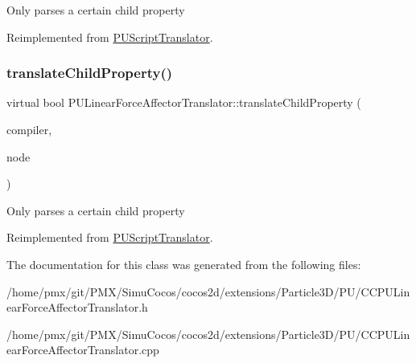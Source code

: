 Only parses a certain child property 

Reimplemented from \hyperlink{classPUScriptTranslator_a0374d83a8a04e57918975d525e0f8fe8}{P\+U\+Script\+Translator}.

\mbox{\label{classPULinearForceAffectorTranslator_a49117f31b3f64755c6998fff1900ee46}} 
\subsubsection{\texorpdfstring{translate\+Child\+Property()}{translateChildProperty()}\hspace{0.1cm}{\footnotesize\ttfamily [2/2]}}
{\footnotesize\ttfamily virtual bool P\+U\+Linear\+Force\+Affector\+Translator\+::translate\+Child\+Property (\begin{DoxyParamCaption}\item[{\hyperlink{classPUScriptCompiler}{P\+U\+Script\+Compiler} $\ast$}]{compiler,  }\item[{\hyperlink{classPUAbstractNode}{P\+U\+Abstract\+Node} $\ast$}]{node }\end{DoxyParamCaption})\hspace{0.3cm}{\ttfamily [virtual]}}

Only parses a certain child property 

Reimplemented from \hyperlink{classPUScriptTranslator_a0374d83a8a04e57918975d525e0f8fe8}{P\+U\+Script\+Translator}.



The documentation for this class was generated from the following files\+:\begin{DoxyCompactItemize}
\item 
/home/pmx/git/\+P\+M\+X/\+Simu\+Cocos/cocos2d/extensions/\+Particle3\+D/\+P\+U/C\+C\+P\+U\+Linear\+Force\+Affector\+Translator.\+h\item 
/home/pmx/git/\+P\+M\+X/\+Simu\+Cocos/cocos2d/extensions/\+Particle3\+D/\+P\+U/C\+C\+P\+U\+Linear\+Force\+Affector\+Translator.\+cpp\end{DoxyCompactItemize}
